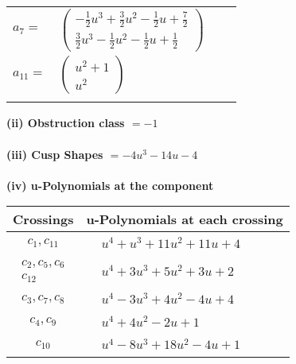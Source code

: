 \documentclass[1p]{elsarticle_modified}
\theoremstyle{definition}
\begin{document}
\begin{tabular}{m{7pt} m{180pt} m{7pt} m{180pt} }
\flushright $a_{7}=$&$\begin{pmatrix}-\frac{1}{2} u^3+\frac{3}{2} u^2-\frac{1}{2} u+\frac{7}{2}\\\frac{3}{2} u^3-\frac{1}{2} u^2-\frac{1}{2} u+\frac{1}{2}\end{pmatrix}$ \\
\flushright $a_{11}=$&$\begin{pmatrix}u^2+1\\u^2\end{pmatrix}$\\&\end{tabular}
\flushleft \textbf{(ii) Obstruction class $= -1$}\\~\\
\flushleft \textbf{(iii) Cusp Shapes $= -4 u^3-14 u-4$}\\~\\
\newpage\renewcommand{\arraystretch}{1}
\flushleft \textbf{(iv) u-Polynomials at the component}\newline \\
\begin{tabular}{m{50pt}|m{274pt}}
Crossings & \hspace{64pt}u-Polynomials at each crossing \\
\hline $$\begin{aligned}c_{1},c_{11}\end{aligned}$$&$\begin{aligned}
&u^4+u^3+11 u^2+11 u+4
\end{aligned}$\\
\hline $$\begin{aligned}c_{2},c_{5},c_{6}\\c_{12}\end{aligned}$$&$\begin{aligned}
&u^4+3 u^3+5 u^2+3 u+2
\end{aligned}$\\
\hline $$\begin{aligned}c_{3},c_{7},c_{8}\end{aligned}$$&$\begin{aligned}
&u^4-3 u^3+4 u^2-4 u+4
\end{aligned}$\\
\hline $$\begin{aligned}c_{4},c_{9}\end{aligned}$$&$\begin{aligned}
&u^4+4 u^2-2 u+1
\end{aligned}$\\
\hline $$\begin{aligned}c_{10}\end{aligned}$$&$\begin{aligned}
&u^4-8 u^3+18 u^2-4 u+1
\end{aligned}$\\
\hline
\end{tabular}\\~\\
\end{document}
